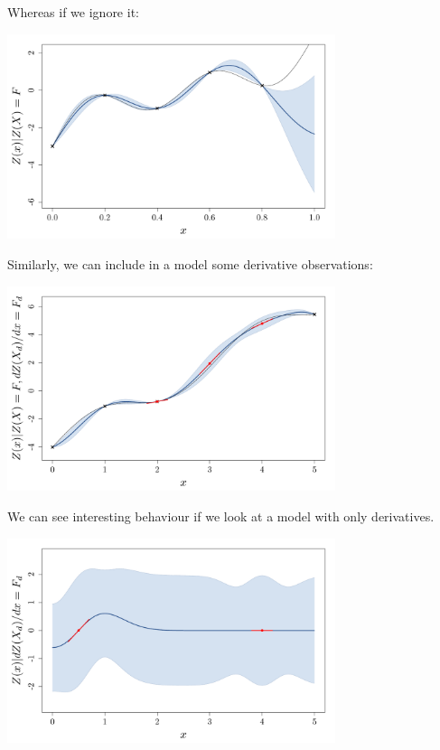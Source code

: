 \documentclass{beamer}
\begin{document}
\begin{frame}{}
\begin{example}
	Whereas if we ignore it:
	\begin{center}
	\includegraphics[height=6cm]{figures/R/exotic_pasint}
	\end{center}
\end{example}
\end{frame}

\begin{frame}{}
Similarly, we can include in a model some derivative observations:
	\begin{center}
	\includegraphics[height=6cm]{figures/R/exotic_der}
	\end{center}
\end{frame}

\begin{frame}{}
We can see interesting behaviour if we look at a model with only derivatives.
	\begin{center}
	\includegraphics[height=6cm]{figures/R/exotic_deronly}
	\end{center}
\end{frame}
\end{document}
